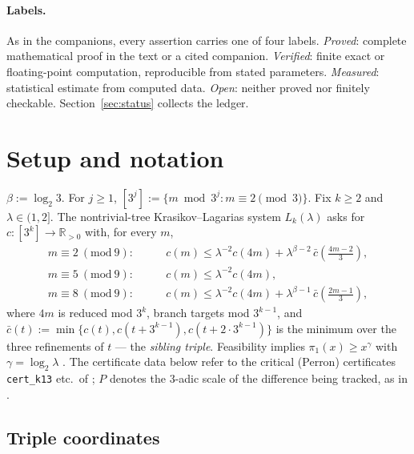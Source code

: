 \documentclass[11pt]{article}
\theoremstyle{definition}
\theoremstyle{remark}
\newcommand{\R}{\mathbb{R}}
\newcommand{\lam}{\lambda}
\newcommand{\gam}{\gamma}
\newcommand{\bet}{\beta}
\begin{document}
\paragraph{Labels.} As in the companions, every assertion carries one of
four labels. \emph{Proved}: complete mathematical proof in the text or a
cited companion. \emph{Verified}: finite exact or floating-point
computation, reproducible from stated parameters. \emph{Measured}:
statistical estimate from computed data. \emph{Open}: neither proved nor
finitely checkable. Section~\ref{sec:status} collects the ledger.

\section{Setup and notation}
\label{sec:setup}

$\bet := \log_2 3$. For $j \geq 1$, $[3^j] := \{ m \bmod 3^j : m \equiv 2
\pmod 3 \}$. Fix $k \geq 2$ and $\lam \in (1,2]$. The nontrivial-tree
Krasikov--Lagarias system $L_k(\lam)$ asks for $c : [3^k] \to \R_{>0}$
with, for every $m$,
\begin{align}
m \equiv 2 \ (\mathrm{mod}\ 9): &\qquad
c(m) \leq \lam^{-2} c(4m) + \lam^{\bet-2}\, \bar c\!\left(\tfrac{4m-2}{3}\right),
\label{eq:L1}\\
m \equiv 5 \ (\mathrm{mod}\ 9): &\qquad
c(m) \leq \lam^{-2} c(4m),
\label{eq:L2}\\
m \equiv 8 \ (\mathrm{mod}\ 9): &\qquad
c(m) \leq \lam^{-2} c(4m) + \lam^{\bet-1}\, \bar c\!\left(\tfrac{2m-1}{3}\right),
\label{eq:L3}
\end{align}
where $4m$ is reduced mod $3^k$, branch targets mod $3^{k-1}$, and
$\bar c(t) := \min\{ c(t), c(t + 3^{k-1}), c(t + 2 \cdot 3^{k-1}) \}$ is
the minimum over the three refinements of $t$ --- the \emph{sibling
triple}. Feasibility implies $\pi_1(x) \geq x^{\gam}$ with
$\gam = \log_2 \lam$ \cite{KL03}. The certificate data below refer to the
critical (Perron) certificates \texttt{cert\_k13} etc.\ of
\cite{Temp26}; $P$ denotes the $3$-adic scale of the difference being
tracked, as in \cite{Drift26}.

\subsection{Triple coordinates}
\end{document}
